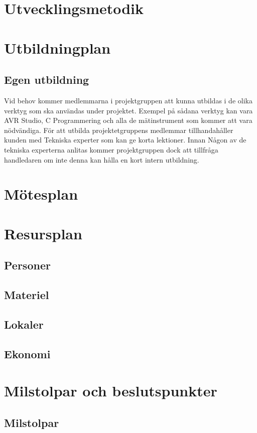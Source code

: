 \documentclass[a4paper,12pt]{article}
\begin{document}
\section{Utvecklingsmetodik}	%

\section{ Utbildningplan}	%
\subsection{Egen utbildning}
Vid behov kommer medlemmarna i projektgruppen att kunna utbildas i de olika verktyg som ska användas under projektet. Exempel på sådana verktyg kan vara AVR Studio, C Programmering och alla de mätinstrument som kommer att vara nödvändiga. För att utbilda projektetgruppens medlemmar tillhandahåller kunden med Tekniska experter som kan ge korta lektioner. Innan Någon av de tekniska experterna anlitas kommer projektgruppen dock att tillfråga handledaren om inte denna kan hålla en kort intern utbildning.

\section{Mötesplan}

\section{Resursplan}	%
\subsection{Personer}
\subsection{Materiel}
\subsection{Lokaler}
\subsection{Ekonomi}

\section{ Milstolpar och beslutspunkter} %

\subsection{Milstolpar}
\end{document}
